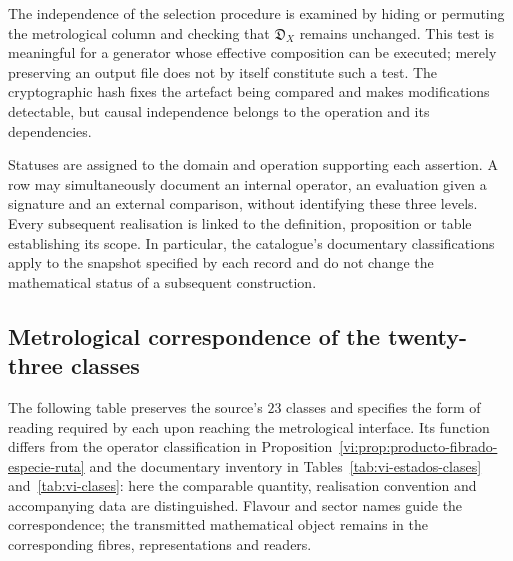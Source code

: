 The independence of the selection procedure is examined by hiding or
permuting the metrological column and checking that \(\mathfrak D_X\)
remains unchanged. This test is meaningful for a generator whose
effective composition can be executed; merely preserving an output
file does not by itself constitute such a test. The cryptographic hash
fixes the artefact being compared and makes modifications detectable, but
causal independence belongs to the operation and its dependencies.

Statuses are assigned to the domain and operation supporting each
assertion. A row may simultaneously document an internal operator,
an evaluation given a signature and an external comparison, without identifying
these three levels. Every subsequent realisation is linked to the
definition, proposition or table establishing its scope. In particular, the
catalogue's documentary classifications apply to the snapshot specified by
each record and do not change the mathematical status of a subsequent
construction.

\subsection{Metrological correspondence of the twenty-three classes}
\label{subsec:vi-clases-metrologia}

The following table preserves the source's \(23\) classes and specifies the
form of reading required by each upon reaching the metrological interface. Its
function differs from the operator classification in
Proposition~\ref{vi:prop:producto-fibrado-especie-ruta} and the documentary inventory
in Tables~\ref{tab:vi-estados-clases} and~\ref{tab:vi-clases}:
here the comparable quantity, realisation convention and
accompanying data are distinguished. Flavour and sector names
guide the correspondence; the transmitted mathematical object remains in
the corresponding fibres, representations and readers.

